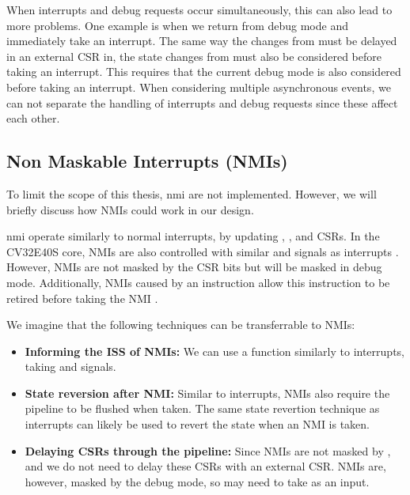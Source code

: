 When interrupts and debug requests occur simultaneously, this can also lead to more problems. One example is when we return from debug mode and immediately take an interrupt.
The same way the changes from  must be delayed in an external CSR in, the state changes from  must also be considered before taking an interrupt. This requires that the current debug mode is also considered before taking an interrupt.
When considering multiple asynchronous events, we can not separate the handling of interrupts and debug requests since these affect each other.

\subsection{Non Maskable Interrupts (NMIs)}

To limit the scope of this thesis, \acrfull{nmi} are not implemented. However, we will briefly discuss how NMIs could work in our design.

\acrfull{nmi} operate similarly to normal interrupts, by updating , , and  CSRs. 
In the CV32E40S core, NMIs are also controlled with similar  and  signals as interrupts \cite{openhwgroupCv32e40s2024}. However, NMIs are not masked by the  CSR bits but will be masked in debug mode. Additionally, NMIs caused by an instruction allow this instruction to be retired before taking the NMI \cite{openhwgroupExceptionsInterruptsCOREV2023}. 

We imagine that the following techniques can be transferrable to NMIs:

\begin{itemize}
    \item \textbf{Informing the ISS of NMIs:} We can use a  function similarly to interrupts, taking  and  signals.
    \item \textbf{State reversion after NMI:} Similar to interrupts, NMIs also require the pipeline to be flushed when taken. The same state revertion technique as interrupts can likely be used to revert the state when an NMI is taken.
    \item \textbf{Delaying CSRs through the pipeline:} Since NMIs are not masked by , and  we do not need to delay these CSRs with an external CSR. NMIs are, however, masked by the debug mode, so  may need to take  as an input. 
\end{itemize}


